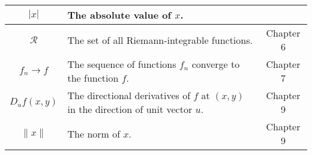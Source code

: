 \begin{table}[h]
{\begin{minipage}{\textwidth}
\begin{tabular}{|c|l|c|}
			$|x|$          & The absolute value of $x$.                                                          &            \\ \hline
			$\mathcal{R}$  & The set of all Riemann-integrable functions.                                        & Chapter 6  \\ \hline
			$f_n\to f$     & The sequence of functions $f_n$ converge to the function $f$.                       & Chapter 7  \\ \hline
			$D_uf(x,y)$    & The directional derivatives of $f$ at $(x, y)$ in the direction of unit vector $u$. & Chapter 9  \\ \hline
			$\|x \|$       & The norm of $x$.                                                                    & Chapter 9  \\ \hline
		\end{tabular}
\end{minipage} }
\end{table}


